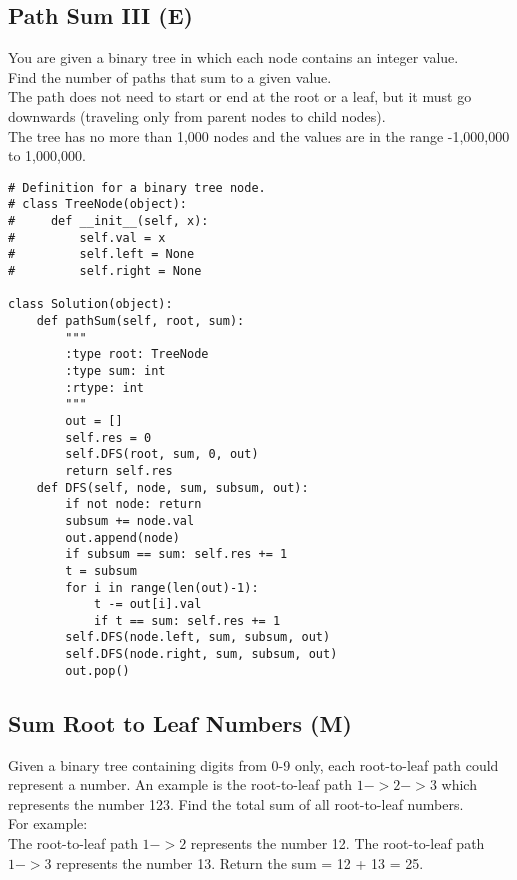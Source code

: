 \subsection{Path Sum III (E)}
You are given a binary tree in which each node contains an integer value.\\

Find the number of paths that sum to a given value.\\

The path does not need to start or end at the root or a leaf, but it must go downwards (traveling only from parent nodes to child nodes).\\

The tree has no more than 1,000 nodes and the values are in the range -1,000,000 to 1,000,000. \\

\begin{lstlisting}
# Definition for a binary tree node.
# class TreeNode(object):
#     def __init__(self, x):
#         self.val = x
#         self.left = None
#         self.right = None

class Solution(object):
    def pathSum(self, root, sum):
        """
        :type root: TreeNode
        :type sum: int
        :rtype: int
        """
        out = []
        self.res = 0
        self.DFS(root, sum, 0, out)
        return self.res
    def DFS(self, node, sum, subsum, out):
        if not node: return
        subsum += node.val
        out.append(node)
        if subsum == sum: self.res += 1
        t = subsum
        for i in range(len(out)-1):
            t -= out[i].val
            if t == sum: self.res += 1
        self.DFS(node.left, sum, subsum, out)
        self.DFS(node.right, sum, subsum, out)
        out.pop()        
\end{lstlisting}

\subsection{Sum Root to Leaf Numbers (M)}
Given a binary tree containing digits from 0-9 only, each root-to-leaf path could represent a number. An example is the root-to-leaf path $1->2->3$ which represents the number 123. Find the total sum of all root-to-leaf numbers.\\

For example: \\
The root-to-leaf path $1->2$ represents the number 12. The root-to-leaf path $1->3$ represents the number 13. Return the sum = 12 + 13 = 25. \\

